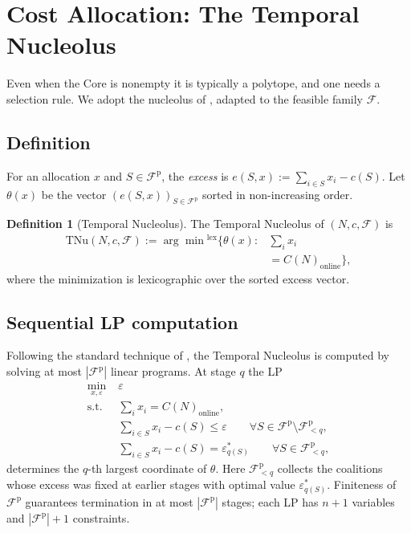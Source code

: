 \documentclass[11pt]{article}
\theoremstyle{plain}
\theoremstyle{definition}
\newtheorem{definition}[theorem]{Definition}
\theoremstyle{remark}
\newcommand{\F}{\mathcal{F}}
\newcommand{\Fp}{\mathcal{F}^{\mathrm{p}}}
\begin{document}
\section{Cost Allocation: The Temporal Nucleolus}
\label{sec:nucleolus}

Even when the Core is nonempty it is typically a polytope, and one needs a selection rule. We adopt the nucleolus of \citet{schmeidler1969nucleolus}, adapted to the feasible family $\F$.

\subsection{Definition}
For an allocation $x$ and $S\in\Fp$, the \emph{excess} is $e(S, x) := \sum_{i\in S} x_i - c(S)$. Let $\theta(x)$ be the vector $(e(S,x))_{S\in\Fp}$ sorted in non-increasing order.

\begin{definition}[Temporal Nucleolus]
\label{def:tnu}
The Temporal Nucleolus of $(N, c, \F)$ is
\[
\begin{aligned}
\mathrm{TNu}(N,c,\F) := \arg\!\min{}^{\text{lex}} \bigl\{ \theta(x) : {} & \textstyle\sum_i x_i \\
& = C(N)_{\text{online}}\bigr\},
\end{aligned}
\]
where the minimization is lexicographic over the sorted excess vector.
\end{definition}

\subsection{Sequential LP computation}

Following the standard technique of \citet{guajardo2015nucleolus}, the Temporal Nucleolus is computed by solving at most $|\Fp|$ linear programs. At stage $q$ the LP
\begin{equation}
\label{eq:lp-q}
\begin{aligned}
\min_{x,\varepsilon} \;& \varepsilon \\
\text{s.t. } \;& \sum_{i} x_i = C(N)_{\text{online}}, \\
& \sum_{i\in S} x_i - c(S) \le \varepsilon \qquad \forall S\in\Fp\setminus\Fp_{<q}, \\
& \sum_{i\in S} x_i - c(S) = \varepsilon_{q(S)}^{\ast} \qquad \forall S\in\Fp_{<q},
\end{aligned}
\end{equation}
determines the $q$-th largest coordinate of $\theta$. Here $\Fp_{<q}$ collects the coalitions whose excess was fixed at earlier stages with optimal value $\varepsilon_{q(S)}^{\ast}$. Finiteness of $\Fp$ guarantees termination in at most $|\Fp|$ stages; each LP has $n+1$ variables and $|\Fp|+1$ constraints.
\end{document}
